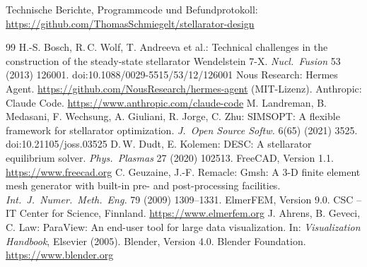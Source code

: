 \documentclass[10pt,a4paper]{article}
\begin{document}
\medskip\noindent Technische Berichte, Programmcode und Befundprotokoll:
\url{https://github.com/ThomasSchmiegelt/stellarator-design}

\begin{thebibliography}{99}\small
{} H.-S. Bosch, R.\,C. Wolf, T. Andreeva et al.: Technical challenges in the construction of
  the steady-state stellarator Wendelstein 7-X. \emph{Nucl.\ Fusion} 53 (2013) 126001.
  doi:10.1088/0029-5515/53/12/126001
 Nous Research: Hermes Agent. \url{https://github.com/NousResearch/hermes-agent} (MIT-Lizenz).
 Anthropic: Claude Code. \url{https://www.anthropic.com/claude-code}
 M. Landreman, B. Medasani, F. Wechsung, A. Giuliani, R. Jorge, C. Zhu: SIMSOPT: A flexible
  framework for stellarator optimization. \emph{J.\ Open Source Softw.} 6(65) (2021) 3525.
  doi:10.21105/joss.03525
 D.\,W. Dudt, E. Kolemen: DESC: A stellarator equilibrium solver. \emph{Phys.\ Plasmas} 27 (2020)
  102513.
 FreeCAD, Version 1.1. \url{https://www.freecad.org}
 C. Geuzaine, J.-F. Remacle: Gmsh: A 3-D finite element mesh generator with built-in pre- and
  post-processing facilities. \emph{Int.\ J.\ Numer.\ Meth.\ Eng.} 79 (2009) 1309--1331.
 ElmerFEM, Version 9.0. CSC -- IT Center for Science, Finnland. \url{https://www.elmerfem.org}
 J. Ahrens, B. Geveci, C. Law: ParaView: An end-user tool for large data visualization. In:
  \emph{Visualization Handbook}, Elsevier (2005).
 Blender, Version 4.0. Blender Foundation. \url{https://www.blender.org}
\end{thebibliography}
\end{document}
